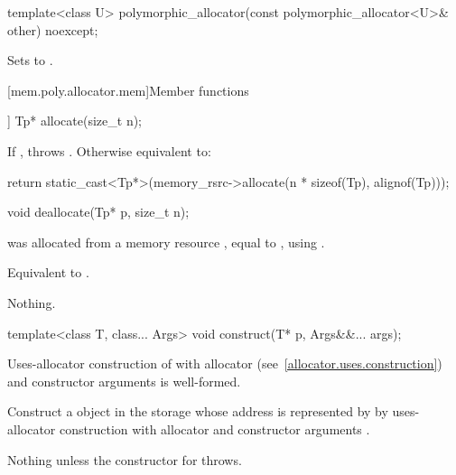 %
\begin{itemdecl}
template<class U> polymorphic_allocator(const polymorphic_allocator<U>& other) noexcept;
\end{itemdecl}

\begin{itemdescr}
\pnum
\effects
Sets  to .
\end{itemdescr}


[mem.poly.allocator.mem]{Member functions}

%
\begin{itemdecl}
[[nodiscard]] Tp* allocate(size_t n);
\end{itemdecl}

\begin{itemdescr}
\pnum
\effects
If , throws .
Otherwise equivalent to:
\begin{codeblock}
return static_cast<Tp*>(memory_rsrc->allocate(n * sizeof(Tp), alignof(Tp)));
\end{codeblock}
\end{itemdescr}

%
\begin{itemdecl}
void deallocate(Tp* p, size_t n);
\end{itemdecl}

\begin{itemdescr}
\pnum
\requires
{} was allocated from a memory resource ,
equal to ,
using .

\pnum
\effects
Equivalent to .

\pnum
\throws
Nothing.
\end{itemdescr}

%
\begin{itemdecl}
template<class T, class... Args>
  void construct(T* p, Args&&... args);
\end{itemdecl}

\begin{itemdescr}
\pnum
\mandates
Uses-allocator construction of 
with allocator  (see~\ref{allocator.uses.construction})
and constructor arguments  is well-formed.

\pnum
\effects
Construct a  object in the storage
whose address is represented by 
by uses-allocator construction with allocator 
and constructor arguments .

\pnum
\throws
Nothing unless the constructor for  throws.
\end{itemdescr}

